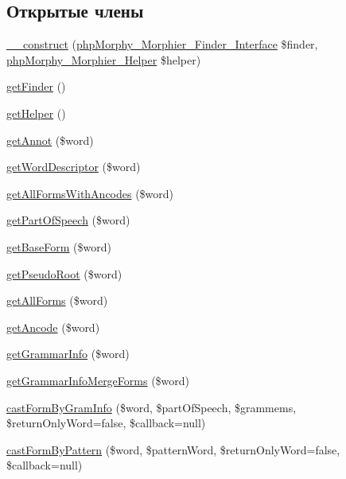 \subsection*{Открытые члены}
\begin{DoxyCompactItemize}
\item 
\hyperlink{classphpMorphy__Morphier__Base_a0e651f08d143de7480c7c74c90e81fa5}{\_\-\_\-construct} (\hyperlink{interfacephpMorphy__Morphier__Finder__Interface}{phpMorphy\_\-Morphier\_\-Finder\_\-Interface} \$finder, \hyperlink{classphpMorphy__Morphier__Helper}{phpMorphy\_\-Morphier\_\-Helper} \$helper)
\item 
\hyperlink{classphpMorphy__Morphier__Base_ac73922acca3d67bd5803e34477653b04}{getFinder} ()
\item 
\hyperlink{classphpMorphy__Morphier__Base_a8a6d66593fec7d41ac2762900e279095}{getHelper} ()
\item 
\hyperlink{classphpMorphy__Morphier__Base_acf96a0aa4f534c65501914a1c59b77e2}{getAnnot} (\$word)
\item 
\hyperlink{classphpMorphy__Morphier__Base_a1eeac170aec9b7cc89919abb7a71b904}{getWordDescriptor} (\$word)
\item 
\hyperlink{classphpMorphy__Morphier__Base_afad7a19c6ab9fa59fdeb52d537322167}{getAllFormsWithAncodes} (\$word)
\item 
\hyperlink{classphpMorphy__Morphier__Base_affa2b5148320befe09393086ecc95d96}{getPartOfSpeech} (\$word)
\item 
\hyperlink{classphpMorphy__Morphier__Base_aebdafea148fef7375740889496f40382}{getBaseForm} (\$word)
\item 
\hyperlink{classphpMorphy__Morphier__Base_acfec84f3817419ccb3e488b6ddd4d92c}{getPseudoRoot} (\$word)
\item 
\hyperlink{classphpMorphy__Morphier__Base_a6ef3a0ecbdd0baf26f6b4e96ee705ff1}{getAllForms} (\$word)
\item 
\hyperlink{classphpMorphy__Morphier__Base_a2eb09ecb250d273fb2abcfdbe5415498}{getAncode} (\$word)
\item 
\hyperlink{classphpMorphy__Morphier__Base_a3cb91c1ce11d88a034be8549559f02e0}{getGrammarInfo} (\$word)
\item 
\hyperlink{classphpMorphy__Morphier__Base_a76b0e9bf1c7da3fb3e3d7622064532a4}{getGrammarInfoMergeForms} (\$word)
\item 
\hyperlink{classphpMorphy__Morphier__Base_aa1f4edf0d902a542363705273c2a05f8}{castFormByGramInfo} (\$word, \$partOfSpeech, \$grammems, \$returnOnlyWord=false, \$callback=null)
\item 
\hyperlink{classphpMorphy__Morphier__Base_a2860811675dd8bf00e369239e50c14b2}{castFormByPattern} (\$word, \$patternWord, \$returnOnlyWord=false, \$callback=null)
\end{DoxyCompactItemize}
